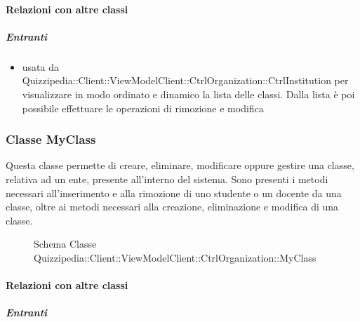 \paragraph{Relazioni con altre classi}
\subparagraph{Entranti}
\begin{itemize}
\item usata da Quizzipedia::Client::ViewModelClient::CtrlOrganization::CtrlInstitution per visualizzare in modo ordinato e dinamico la lista delle classi. Dalla lista è poi possibile effettuare le operazioni di rimozione e modifica
\end{itemize}
\subsubsection{Classe MyClass}
Questa classe permette di creare, eliminare, modificare oppure gestire una classe, relativa ad un ente, presente all'interno del sistema.
Sono presenti i metodi necessari all'inserimento e alla rimozione di uno studente o un docente da una classe, oltre ai metodi necessari alla creazione, eliminazione e modifica di una classe.
\begin{figure}[H]
\centering
\noindent{}
\caption[Schema Classe MyClass]{Schema Classe Quizzipedia::Client::ViewModelClient::CtrlOrganization::MyClass}
\end{figure}
\paragraph{Relazioni con altre classi}
\subparagraph{Entranti}
